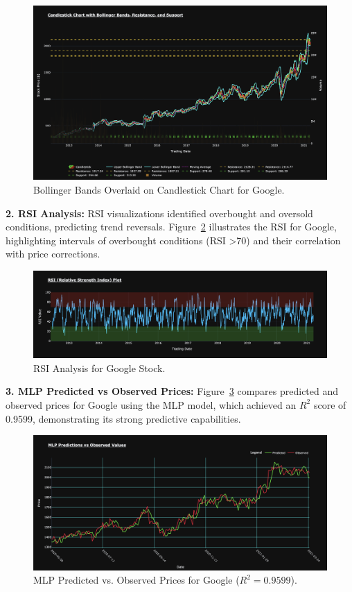 \documentclass[conference]{IEEEtran}
\begin{document}
\begin{figure}[!h]
\centering
\includegraphics[width=\linewidth]{bollinger_google.png}
\caption{Bollinger Bands Overlaid on Candlestick Chart for Google.}
\label{fig:bollinger_bands}
\end{figure}

\textbf{2. RSI Analysis:} 
RSI visualizations identified overbought and oversold conditions, predicting trend reversals. Figure~\ref{fig:rsi_google} illustrates the RSI for Google, highlighting intervals of overbought conditions (RSI \textgreater 70) and their correlation with price corrections.

\begin{figure}[!h]
\centering
\includegraphics[width=\linewidth]{rsi_google.png}
\caption{RSI Analysis for Google Stock.}
\label{fig:rsi_google}
\end{figure}

\textbf{3. MLP Predicted vs Observed Prices:} 
Figure~\ref{fig:mlp_google_predicted} compares predicted and observed prices for Google using the MLP model, which achieved an $R^2$ score of 0.9599, demonstrating its strong predictive capabilities.

\begin{figure}[!h]
\centering
\includegraphics[width=\linewidth]{mlp_google.png}
\caption{MLP Predicted vs. Observed Prices for Google ($R^2 = 0.9599$).}
\label{fig:mlp_google_predicted}
\end{figure}
\end{document}
